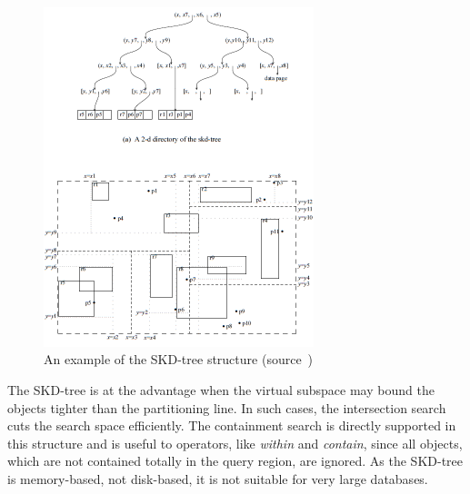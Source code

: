 \documentclass[a4paper,12pt]{article}
\begin{document}
\begin{figure}
\centering
\includegraphics[width=0.7\textwidth,height=0.6\textheight]{skdtree}
\caption{An example of the SKD-tree structure (source~\cite{survey})}
\label{figskdtree}
\end{figure} 
The SKD-tree is at the advantage when the virtual subspace may bound the objects tighter than the partitioning line. In such cases, the intersection search cuts the search space efficiently. The containment search is directly supported in this structure and is useful to operators, like \textit{within} and \textit{contain}, since all objects, which are not contained totally in the query region, are ignored.
As the SKD-tree is memory-based, not disk-based, it is not suitable for very large databases.


 
\end{document}

